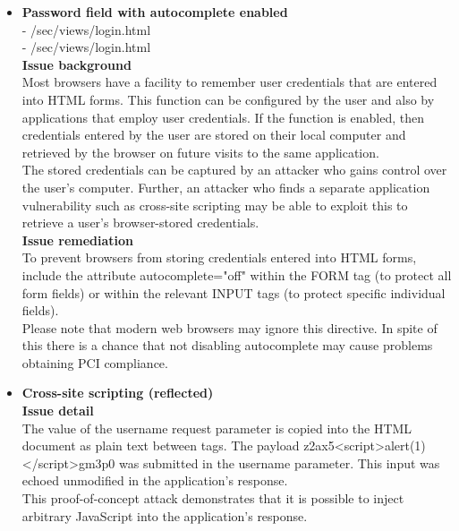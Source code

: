 \begin{itemize}
\item \textbf{Password field with autocomplete enabled} \\
- /sec/views/login.html \\
- /sec/views/login.html \\

\textbf{Issue background} \\
Most browsers have a facility to remember user credentials that are entered into HTML forms. This function can be configured by the user and also by applications that employ user credentials. If the function is enabled, then credentials entered by the user are stored on their local computer and retrieved by the browser on future visits to the same application.\\

The stored credentials can be captured by an attacker who gains control over the user's computer. Further, an attacker who finds a separate application vulnerability such as cross-site scripting may be able to exploit this to retrieve a user's browser-stored credentials.\\

\textbf{Issue remediation} \\
To prevent browsers from storing credentials entered into HTML forms, include the attribute autocomplete="off" within the FORM tag (to protect all form fields) or within the relevant INPUT tags (to protect specific individual fields). \\

Please note that modern web browsers may ignore this directive. In spite of this there is a chance that not disabling autocomplete may cause problems obtaining PCI compliance.\\


\item \textbf{Cross-site scripting (reflected)} \\

\textbf{Issue detail} \\
The value of the username request parameter is copied into the HTML document as plain text between tags. The payload z2ax5<script>alert(1)</script>gm3p0 was submitted in the username parameter. This input was echoed unmodified in the application's response. \\

This proof-of-concept attack demonstrates that it is possible to inject arbitrary JavaScript into the application's response. \\


\end{itemize}
